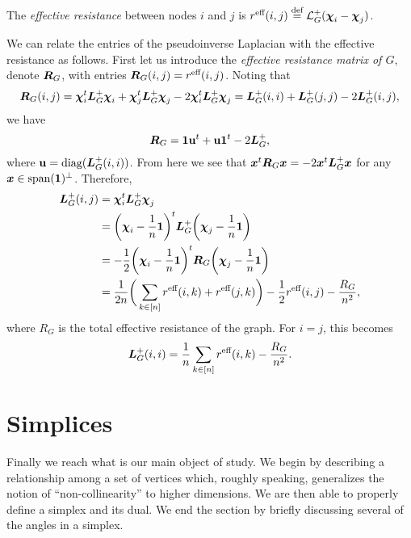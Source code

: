 \begin{definition}
	\label{def:effective_resistance}
	The \emph{effective resistance} between nodes $i$ and $j$ is $r^{\text{eff}}(i,j) \overset{\text{def}}{=} \mathcal{L}_G^+(\boldsymbol{\chi}_i-\boldsymbol{\chi}_j)$.  
\end{definition}

We can relate the entries of the pseudoinverse Laplacian with the effective resistance as  follows. First let us introduce the \emph{effective resistance matrix of $G$}, denote $\vb*{R}_G$,  with  entries $\vb*{R}_G(i,j) = r^{\text{eff}}(i,j)$. Noting  that 
\begin{equation*}
\vb*{R}_G(i,j) = \boldsymbol{\chi}_i^t\vb*{L}_G^+\boldsymbol{\chi}_i + \boldsymbol{\chi}_j^t \vb*{L}_G^+\boldsymbol{\chi}_j -2 \boldsymbol{\chi}_i^t \vb*{L}_G^+\boldsymbol{\chi}_j = \vb*{L}_G^+(i,i) + \vb*{L}_G^+(j,j) - 2\vb*{L}_G^+(i,j),
\end{equation*}
we have 
\begin{equation*}
\vb*{R}_G = \vb{1} \vb{u} ^t + \vb{u}\vb{1}^t - 2\vb*{L}_G^+,
\end{equation*}
where  $\vb{u}=\text{diag}(\vb*{L}_G^+(i,i))$.  From here we  see that $\vb*{x}^t \vb*{R}_G\vb*{x} = -2\vb*{x}^t \vb*{L}_G^+\vb*{x}$ for any $\vb*{x}\in\textnormal{span}(\vb{1})^\perp$. Therefore, 
\begin{align}
\vb*{L}_G^+(i,j)&=\boldsymbol{\chi}_i^t \vb*{L}_G^+\boldsymbol{\chi}_j \notag \\
&= \bigg(\boldsymbol{\chi}_i-\frac{1}{n}\vb{1}\bigg)^t \vb*{L}_G^+\bigg(\boldsymbol{\chi}_j-\frac{1}{n}\vb{1}\bigg) \notag \\
&= -\frac{1}{2}\bigg(\boldsymbol{\chi}_i-\frac{1}{n}\vb{1}\bigg)^t \vb*{R}_G\bigg(\boldsymbol{\chi}_j-\frac{1}{n}\vb{1}\bigg) \notag \\
&= \frac{1}{2n}\bigg(\sum_{k\in[n]}r^{\text{eff}}(i,k)+r^{\text{eff}}(j,k)\bigg) - \frac{1}{2}r^{\text{eff}}(i,j) -\frac{R_G}{n^2}, \label{eq:L^+(i,j)}
\end{align}
where $R_G$ is the total effective resistance of the graph. 
For $i=j$, this becomes 
\begin{align}
\vb*{L}_G^+(i,i) = \frac{1}{n} \sum_{k\in[n]}r^{\text{eff}}(i,k) - \frac{R_G}{n^2}.\label{eq:L^+(i,i)}
\end{align}




\section{Simplices}
\label{sec:background_simplices}

Finally we reach what is our main object of study. We begin by describing a  relationship  among a set  of vertices which,  roughly speaking,  generalizes the notion of ``non-collinearity'' to  higher dimensions. We are then able to properly define a simplex and its dual. We end the section by briefly discussing several  of the angles in a simplex. 

